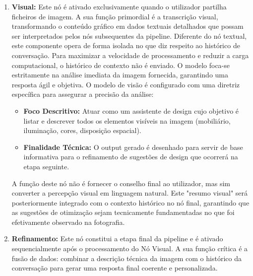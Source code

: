 \documentclass[a4paper,12pt]{scrreprt}
\begin{document}
\begin{enumerate}
\begin{enumerate}
                \item \textbf{Localização Linguística:} Tradução e adaptação obrigatória de todos os outputs para português de Portugal.
                \item \textbf{Gestão de Contexto e Memória:} Uma característica fundamental deste nó é a manutenção da coerência conversacional. A cada nova interação, o sistema injeta o histórico completo da sessão atual na pipeline. Esta abordagem permite que o modelo possua memória de curto prazo, sendo capaz de compreender referências a mensagens anteriores e manter a continuidade lógica do diálogo.
            \end{enumerate}
            \item \textbf{Visual:} Este nó é ativado exclusivamente quando o utilizador partilha ficheiros de imagem. A sua função primordial é a transcrição visual, transformando o conteúdo gráfico em dados textuais detalhados que possam ser interpretados pelos nós subsequentes da pipeline.
            Diferente do nó textual, este componente opera de forma isolada no que diz respeito ao histórico de conversação. Para maximizar a velocidade de processamento e reduzir a carga computacional, o histórico de contexto não é enviado. O modelo foca-se estritamente na análise imediata da imagem fornecida, garantindo uma resposta ágil e objetiva.
            O modelo de visão é configurado com uma diretriz específica para assegurar a precisão da análise:
            \begin{itemize}
                \item \textbf{Foco Descritivo:} Atuar como um assistente de design cujo objetivo é listar e descrever todos os elementos visíveis na imagem (mobiliário, iluminação, cores, disposição espacial).
                \item \textbf{Finalidade Técnica:} O output gerado é desenhado para servir de base informativa para o refinamento de sugestões de design que ocorrerá na etapa seguinte.
            \end{itemize}
            A função deste nó não é fornecer o conselho final ao utilizador, mas sim converter a percepção visual em linguagem natural. Este "resumo visual" será posteriormente integrado com o contexto histórico no nó final, garantindo que as sugestões de otimização sejam tecnicamente fundamentadas no que foi efetivamente observado na fotografia.
            \item \textbf{Refinamento:} Este nó constitui a etapa final da pipeline e é ativado sequencialmente após o processamento do Nó Visual. A sua função crítica é a fusão de dados: combinar a descrição técnica da imagem com o histórico da conversação para gerar uma resposta final coerente e personalizada.

\end{enumerate}
\end{document}

